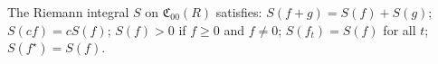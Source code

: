 The Riemann integral $S$ on $\mathfrak{C}_{00}(R)$ satisfies: $S(f + g) = S(f) + S(g)$; $S(cf) = cS(f)$; $S(f) > 0$ if $f \geq 0$ and $f \neq 0$; $S(f_t) = S(f)$ for all $t$; $S(f^{\star}) = S(f)$.
